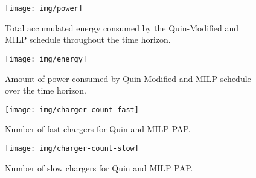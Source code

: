 \documentclass[utf8]{FrontiersinHarvard}
\begin{document}
\begin{figure}[htpb]
\centering
    \texttt{[image: img/power]}
    \caption{Total accumulated energy consumed by the Quin-Modified and MILP schedule throughout the time horizon.}
    \label{fig:power-usage}
\end{figure}

\begin{figure}[htpb]
\centering
    \texttt{[image: img/energy]}
    \caption{Amount of power consumed by Quin-Modified and MILP schedule over the time horizon.}
    \label{fig:energy-usage}
\end{figure}

\begin{subfigures}
    \begin{figure}[htpb]
    \centering
        \texttt{[image: img/charger-count-fast]}
        \caption{Number of fast chargers for Quin and MILP PAP.}
        \label{subfig:fast-charger-usage}
    \end{figure}

    \hfill

    \begin{figure}[!ht]
    \centering
        \texttt{[image: img/charger-count-slow]}
        \caption{Number of slow chargers for Quin and MILP PAP.}
        \label{subfig:slow-charger-usage}
    \end{figure}
\end{subfigures}
\end{document}
